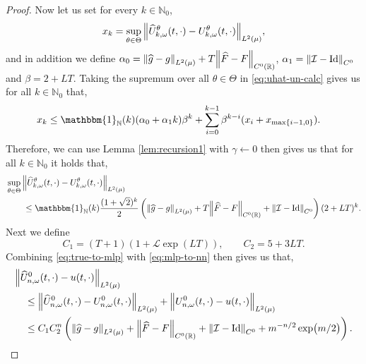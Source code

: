 \documentclass{article}
\numberwithin{equation}{section}
\newcommand{\Id}{\mathrm{Id}}
\newcommand{\R}{\mathbb{R}}
\newcommand{\N}{\mathbb{N}}
\newcommand{\cI}{\mathcal{I}}
\newcommand{\cL}{\mathcal{L}}
\newcommand{\mlp}{U}
\newcommand{\1}{\mathbbm{1}}
\newcommand{\Fhat}{\widehat{F}}
\newcommand{\Uhat}{\widehat{U}}
\newcommand{\ghat}{\widehat{g}}
\begin{document}
\begin{proof}
Now let us set for every $k\in\N_0$, 
\begin{equation}
    x_k = \sup_{\theta\in\Theta} \norm{\Uhat_{k,\omega}^\theta(t,\cdot)-U^\theta_{k,\omega}(t,\cdot)}_{L^2(\mu)},
\end{equation}
and in addition we define $\alpha_0 = \norm{\ghat-g}_{L^2(\mu)} +T\norm{\Fhat-F}_{C^0(\R)}$, $\alpha_1 =  \norm{\cI-\Id}_{C^0}$ and $\beta = 2+LT$.  
Taking the supremum over all $\theta\in\Theta$ in \eqref{eq:uhat-un-calc} gives us for all $k\in\N_0$ that,
\begin{equation}
\begin{split}
    x_k 
    &\leq \1_\N(k)(\alpha_0+\alpha_1k)\beta^k + \sum_{i=0}^{k-1} \beta^{k-i} (x_{i}+x_{\max\{i-1,0\}}). 
\end{split}
\end{equation}
Therefore, we can use Lemma \ref{lem:recursion1} with $\gamma\leftarrow 0$ then gives us that for all $k\in\N_0$ it holds that,
\begin{equation}\label{eq:mlp-to-nn}
\begin{split}
    &\sup_{\theta\in\Theta} \norm{\Uhat_{k,\omega}^\theta(t,\cdot)-U^\theta_{k,\omega}(t,\cdot)}_{L^2(\mu)}\\ &\qquad\leq \1_\N(k) \frac{(1+\sqrt{2})^k}{2} \left(\norm{\ghat-g}_{L^2(\mu)}+T\norm{\Fhat-F}_{C^0(\R)}+ \norm{\cI-\Id}_{C^0}\right)(2+LT)^k.
\end{split}
\end{equation}
Next we define
\begin{equation}\label{eq:C1-C2}
    C_1 = (T+1)(1+\cL \exp(LT)), \qquad C_2 = 5+3LT.
\end{equation}
Combining \eqref{eq:true-to-mlp} with \eqref{eq:mlp-to-nn} then gives us that, 
\begin{equation}\label{eq:nn-error-bound}
\begin{split}
     &\norm{\Uhat^0_{n,\omega}(t,\cdot)-u(t,\cdot)}_{L^2(\mu)} \\
     &\quad \leq \norm{\Uhat^0_{n,\omega}(t,\cdot)-\mlp^0_{n,\omega}(t,\cdot)}_{L^2(\mu)}+\norm{\mlp^0_{n,\omega}(t,\cdot)-u(t,\cdot)}_{L^2(\mu)}\\
     &\quad \leq C_1 C_2^n \left( \norm{\ghat-g}_{L^2(\mu)}+\norm{\Fhat-F}_{C^0(\R)} + \norm{\cI-\Id}_{C^0}+ m^{-n/2}\exp(m/2)\right). 
\end{split}
\end{equation}

\end{proof}
\end{document}
